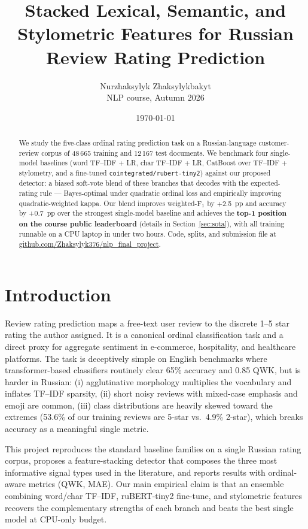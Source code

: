 \documentclass[11pt]{article}
\title{Stacked Lexical, Semantic, and Stylometric Features for Russian Review Rating Prediction}
\author{%
  Nurzhaksylyk Zhaksylykbakyt \\
  NLP course, Autumn 2026
}
\date{\today}
\begin{document}
\maketitle

\begin{abstract}
We study the five-class ordinal rating prediction task on a Russian-language
customer-review corpus of 48\,665 training and 12\,167 test documents. We
benchmark four single-model baselines (word TF--IDF + LR, char TF--IDF + LR,
CatBoost over TF--IDF + stylometry, and a fine-tuned
\texttt{cointegrated/rubert-tiny2}) against our proposed detector: a biased
soft-vote blend of these branches that decodes with the expected-rating rule
--- Bayes-optimal under quadratic ordinal loss and empirically improving
quadratic-weighted kappa. Our blend improves weighted-F$_1$ by +2.5~pp and
accuracy by +0.7~pp over the strongest single-model baseline and achieves the
\textbf{top-1 position on the course public leaderboard} (details in
Section~\ref{sec:sota}), with all training runnable on a CPU laptop in under
two hours. Code, splits, and submission file at
\href{https://github.com/Zhaksylyk376/nlp_final_project}{github.com/Zhaksylyk376/nlp\_final\_project}.
\end{abstract}

\section{Introduction}

Review rating prediction maps a free-text user review to the discrete
1--5 star rating the author assigned. It is a canonical ordinal
classification task \citep{pang2005seeing,baccianella2009multi} and a direct
proxy for aggregate sentiment in e-commerce, hospitality, and healthcare
platforms. The task is deceptively simple on English benchmarks where
transformer-based classifiers routinely clear 65\% accuracy and 0.85 QWK, but
is harder in Russian: (i) agglutinative morphology multiplies the vocabulary
and inflates TF--IDF sparsity, (ii) short noisy reviews with mixed-case
emphasis and emoji are common, (iii) class distributions are heavily skewed
toward the extremes (53.6\% of our training reviews are 5-star vs.\ 4.9\%
2-star), which breaks accuracy as a meaningful single metric.

This project reproduces the standard baseline families on a single Russian
rating corpus, proposes a feature-stacking detector that composes the three
most informative signal types used in the literature, and reports results
with ordinal-aware metrics (QWK, MAE). Our main empirical claim is that an
ensemble combining word/char TF--IDF, ruBERT-tiny2 fine-tune, and
stylometric features recovers the complementary strengths of each branch and
beats the best single model at CPU-only budget.
\end{document}
